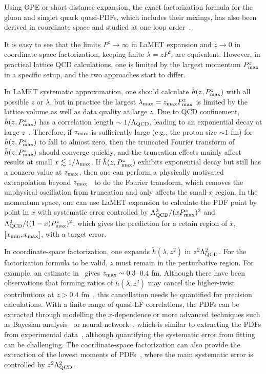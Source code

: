 \documentclass[aps,rmp,reprint,amsmath,amssymb,graphicx,longbibliography]{revtex4-1} %
\begin{document}
Using OPE or short-distance expansion, the exact factorization formula for the gluon and singlet quark quasi-PDFs, which includes their mixings, has also been derived in coordinate space and studied at one-loop order~\cite{Wang:2019tgg,Balitsky:2019krf}.

It is easy to see that the limits $P^z\to\infty$ in LaMET expansion and $z\to 0$
in coordinate-space factorization, keeping finite $\lambda=zP^z$, are equivalent.  However, in practical
lattice QCD calculations, one is limited by the largest
momentum $P^z_{\rm max}$ in a specific setup, and the two approaches start to differ.

In LaMET systematic approximation, one should calculate $\tilde h (z, P^z_{\rm max})$ with
all possible $z$ or $\lambda$, but in practice the largest $\lambda_{\rm max} = z_{\rm max}P^z_{\rm max}$
is limited by the lattice volume as well as data quality at large $z$. Due to QCD confinement, $\tilde h (z, P^z_{\rm max})$ has a correlation length $\sim 1/\Lambda_{\rm QCD}$, leading to an exponential decay
at large $z$~\cite{Ji:2020brr}. Therefore, if $z_{\rm max}$ is sufficiently large (e.g., the proton size $\sim1$ fm) for $\tilde h (z, P^z_{\rm max})$ to fall to almost zero, then the truncated Fourier transform of $\tilde h (z, P^z_{\rm max})$
should converge quickly, and the truncation effects mainly affect results at small $x \lesssim 1/\lambda_{\rm max}$. If $\tilde h (z, P^z_{\rm max})$ exhibits exponential decay but still has a nonzero value at $z_{\rm max}$, then one can perform a physically motivated extrapolation beyond $z_{\rm max}$~\cite{Ji:2020brr} to do the Fourier transform, which removes the unphysical oscillation from truncation and only affects the small-$x$ region. In the momentum space, one can use LaMET expansion to calculate the PDF point by point in $x$ with systematic error controlled by $\Lambda_{\rm QCD}^2/(xP^z_{\rm max})^2$ and $\Lambda_{\rm QCD}^2/((1-x)P^z_{\rm max})^2$, which gives the prediction for a cetain region of $x$, $[x_{\rm min}, x_{\rm max}]$, with a target error.

In coordinate-space factorization, one expands $\tilde h(\lambda, z^2)$ in $z^2\Lambda^2_{\rm QCD}$. For the factorization formula to be valid,  $z$ must remain in the perturbative region. For example, an estimate in~\cite{Ji:2020brr} gives $z_{\rm max}\sim 0.3$--$0.4$ fm. Although there have been observations that forming ratios of $\tilde h (\lambda, z^2)$ may cancel the higher-twist contributions at $z>0.4$ fm~\cite{Orginos:2017kos}, this cancellation needs be quantified
for precision calculations. With a finite range of quasi-LF correlations, the PDFs can be extracted through modelling
the $x$-dependence or more advanced techniques such as Bayesian analysis~\cite{Bringewatt:2020ixn} or neural network~\cite{Karpie:2019eiq,Cichy:2019ebf,DelDebbio:2020rgv}, which is similar to extracting the PDFs from experimental data~\cite{Ma:2017pxb}, although quantifying the
systematic error from fitting can be challenging. The coordinate-space factorization can also provide the extraction of the lowest moments of PDFs~\cite{Karpie:2018zaz,Shugert:2020tgq,Joo:2020spy,Gao:2020ito}, where the main systematic error is controlled by $z^2\Lambda_{\rm QCD}^2$.
\end{document}

